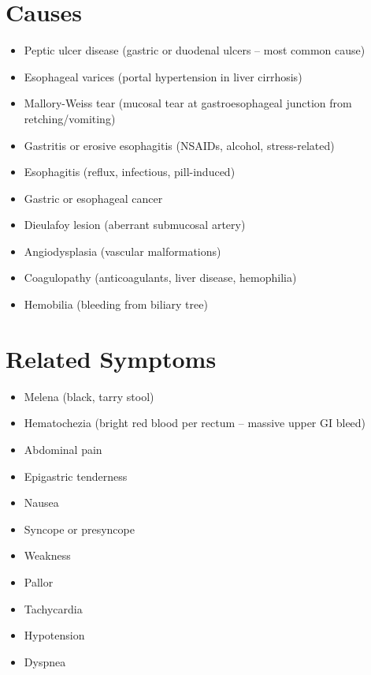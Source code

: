 \section*{Causes}
\begin{itemize}
  \item Peptic ulcer disease (gastric or duodenal ulcers -- most common cause)
  \item Esophageal varices (portal hypertension in liver cirrhosis)
  \item Mallory-Weiss tear (mucosal tear at gastroesophageal junction from retching/vomiting)
  \item Gastritis or erosive esophagitis (NSAIDs, alcohol, stress-related)
  \item Esophagitis (reflux, infectious, pill-induced)
  \item Gastric or esophageal cancer
  \item Dieulafoy lesion (aberrant submucosal artery)
  \item Angiodysplasia (vascular malformations)
  \item Coagulopathy (anticoagulants, liver disease, hemophilia)
  \item Hemobilia (bleeding from biliary tree)
\end{itemize}

\section*{Related Symptoms}
\begin{itemize}
  \item Melena (black, tarry stool)
  \item Hematochezia (bright red blood per rectum -- massive upper GI bleed)
  \item Abdominal pain
  \item Epigastric tenderness
  \item Nausea
  \item Syncope or presyncope
  \item Weakness
  \item Pallor
  \item Tachycardia
  \item Hypotension
  \item Dyspnea
\end{itemize}

